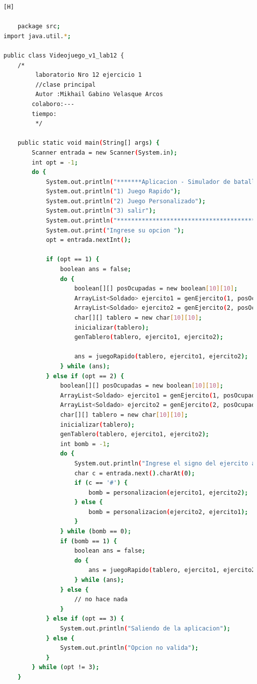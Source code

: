 \documentclass{article}
\begin{document}
	\begin{lstlisting}[language=bash,caption={Creando la clase principal de VideoJuego_v1_lab12.java}][H]
	
	package src;
import java.util.*;

public class Videojuego_v1_lab12 {
	/*	
		 laboratorio Nro 12 ejercicio 1
		 //clase principal
		 Autor :Mikhail Gabino Velasque Arcos
		colaboro:---
		tiempo:
		 */

	public static void main(String[] args) {
        Scanner entrada = new Scanner(System.in);
        int opt = -1;
        do {
            System.out.println("*******Aplicacion - Simulador de batalla********");
            System.out.println("1) Juego Rapido");
            System.out.println("2) Juego Personalizado");
            System.out.println("3) salir");
            System.out.println("*************************************************");
            System.out.print("Ingrese su opcion ");
            opt = entrada.nextInt();
            
            if (opt == 1) {
                boolean ans = false;
                do {
                    boolean[][] posOcupadas = new boolean[10][10];
                    ArrayList<Soldado> ejercito1 = genEjercito(1, posOcupadas);
                    ArrayList<Soldado> ejercito2 = genEjercito(2, posOcupadas);
                    char[][] tablero = new char[10][10];
                    inicializar(tablero);
                    genTablero(tablero, ejercito1, ejercito2);

                    ans = juegoRapido(tablero, ejercito1, ejercito2);
                } while (ans);
            } else if (opt == 2) {
                boolean[][] posOcupadas = new boolean[10][10];
                ArrayList<Soldado> ejercito1 = genEjercito(1, posOcupadas);
                ArrayList<Soldado> ejercito2 = genEjercito(2, posOcupadas);
                char[][] tablero = new char[10][10];
                inicializar(tablero);
                genTablero(tablero, ejercito1, ejercito2);
                int bomb = -1;
                do {
                    System.out.println("Ingrese el signo del ejercito a personalizar");
                    char c = entrada.next().charAt(0);
                    if (c == '#') {
                        bomb = personalizacion(ejercito1, ejercito2);
                    } else {
                        bomb = personalizacion(ejercito2, ejercito1);
                    }
                } while (bomb == 0);
                if (bomb == 1) {
                    boolean ans = false;
                    do {
                        ans = juegoRapido(tablero, ejercito1, ejercito2);
                    } while (ans);
                } else {
                    // no hace nada
                }
            } else if (opt == 3) {
                System.out.println("Saliendo de la aplicacion");
            } else {
                System.out.println("Opcion no valida");
            }
        } while (opt != 3);
    }


\end{lstlisting}
\end{document}
